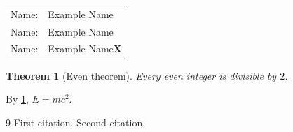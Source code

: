\documentclass{article}
\newcommand{\studentname}{Example Name}
\begin{document}
\begin{tabular}{rl}
Name: & \studentname \\[0.5cm]
Name: & \studentname
\\[0.5cm]
Name: & \studentname \textbf{X} \\
\end{tabular}

\newtheorem{theorem}{Theorem}
\begin{theorem}[Even theorem]
\label{Even theorem}%
Every even integer is divisible by $2$.
\end{theorem}
By \ref{Even theorem}, $E = mc^2$.

\cite{
    first,
    second
}
\begin{thebibliography}{9}
 First citation.
 Second citation.
\end{thebibliography}
\end{document}
